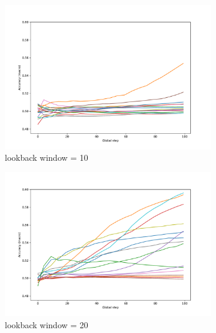 \documentclass[aps,prb,groupedaddress,twocolumn,showpacs,dvipdfmx,superscriptaddress,pdftex]{revtex4-2}
\begin{document}
\begin{figure}[H]
    \centering
    \begin{subfigure}[b]{\linewidth}
        \centering
        \includegraphics[width=\textwidth]{img/lstm_10.pdf}
        \caption{lookback window = 10}
        \label{fig:image1}
    \end{subfigure}
    \begin{subfigure}[b]{\linewidth}
        \centering
        \includegraphics[width=\textwidth]{img/lstm_20.pdf}
        \caption{lookback window = 20}
        \label{fig:image2}
    \end{subfigure}
    \begin{subfigure}[b]{\linewidth}

\end{subfigure}
\end{figure}
\end{document}

